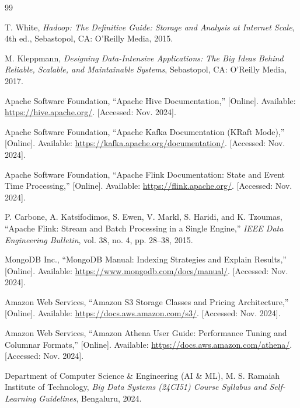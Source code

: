 \documentclass[12pt,a4paper]{report}
\begin{document}
\clearpage
{}
\begin{thebibliography}{99}

T. White, \textit{Hadoop: The Definitive Guide: Storage and Analysis at Internet Scale}, 4th ed., Sebastopol, CA: O'Reilly Media, 2015.

M. Kleppmann, \textit{Designing Data-Intensive Applications: The Big Ideas Behind Reliable, Scalable, and Maintainable Systems}, Sebastopol, CA: O'Reilly Media, 2017.

Apache Software Foundation, ``Apache Hive Documentation,'' [Online]. Available: \url{https://hive.apache.org/}. [Accessed: Nov. 2024].

Apache Software Foundation, ``Apache Kafka Documentation (KRaft Mode),'' [Online]. Available: \url{https://kafka.apache.org/documentation/}. [Accessed: Nov. 2024].

Apache Software Foundation, ``Apache Flink Documentation: State and Event Time Processing,'' [Online]. Available: \url{https://flink.apache.org/}. [Accessed: Nov. 2024].

P. Carbone, A. Katsifodimos, S. Ewen, V. Markl, S. Haridi, and K. Tzoumas, ``Apache Flink: Stream and Batch Processing in a Single Engine,'' \textit{IEEE Data Engineering Bulletin}, vol. 38, no. 4, pp. 28--38, 2015.

MongoDB Inc., ``MongoDB Manual: Indexing Strategies and Explain Results,'' [Online]. Available: \url{https://www.mongodb.com/docs/manual/}. [Accessed: Nov. 2024].

Amazon Web Services, ``Amazon S3 Storage Classes and Pricing Architecture,'' [Online]. Available: \url{https://docs.aws.amazon.com/s3/}. [Accessed: Nov. 2024].

Amazon Web Services, ``Amazon Athena User Guide: Performance Tuning and Columnar Formats,'' [Online]. Available: \url{https://docs.aws.amazon.com/athena/}. [Accessed: Nov. 2024].

Department of Computer Science \& Engineering (AI \& ML), M. S. Ramaiah Institute of Technology, \textit{Big Data Systems (24CI51) Course Syllabus and Self-Learning Guidelines}, Bengaluru, 2024.

\end{thebibliography}
\end{document}

